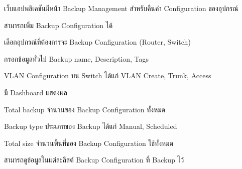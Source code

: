 \begin{mycustomenum2}
    \item เว็บแอปพลิเคชันมีหน้า Backup Management สำหรับคืนค่า Configuration ของอุปกรณ์
    \begin{mycustomenum2}
        \item สามารถเพิ่ม Backup Configuration ได้
            \begin{mycustomenum2}
                \item เลือกอุปกรณ์ที่ต้องการจะ Backup Configuration (Router, Switch)
                \item กรอกข้อมูลทั่วไป Backup name, Description, Tags
                \item VLAN Configuration บน Switch ได้แก่ VLAN Create, Trunk, Access 
            \end{mycustomenum2} 
        \item มี Dashboard แสดงผล
            \begin{mycustomenum2}
                \item Total backup จำนวนของ Backup Configuration ทั้งหมด
                \item Backup type ประเภทของ Backup ได้แก่ Manual, Scheduled
                \item Total size จำนวนพื้นที่ของ Backup Configuration ใช้ทั้งหมด
            \end{mycustomenum2} 
        \item สามารถดูข้อมูลในแต่ละลิสต์ Backup Configuration ที่ Backup ไว้ 
    \end{mycustomenum2}

\end{mycustomenum2}


